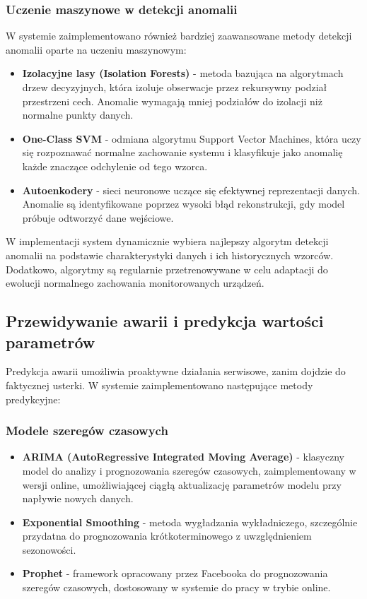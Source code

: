 \subsubsection{Uczenie maszynowe w detekcji anomalii}
\label{subsubsec:ml_anomalie}

W systemie zaimplementowano również bardziej zaawansowane metody detekcji anomalii oparte na uczeniu maszynowym:

\begin{itemize}
    \item \textbf{Izolacyjne lasy (Isolation Forests)} - metoda bazująca na algorytmach drzew decyzyjnych, która izoluje obserwacje przez rekursywny podział przestrzeni cech. Anomalie wymagają mniej podziałów do izolacji niż normalne punkty danych.
    \item \textbf{One-Class SVM} - odmiana algorytmu Support Vector Machines, która uczy się rozpoznawać normalne zachowanie systemu i klasyfikuje jako anomalię każde znaczące odchylenie od tego wzorca.
    \item \textbf{Autoenkodery} - sieci neuronowe uczące się efektywnej reprezentacji danych. Anomalie są identyfikowane poprzez wysoki błąd rekonstrukcji, gdy model próbuje odtworzyć dane wejściowe.
\end{itemize}

W implementacji system dynamicznie wybiera najlepszy algorytm detekcji anomalii na podstawie charakterystyki danych i ich historycznych wzorców. Dodatkowo, algorytmy są regularnie przetrenowywane w celu adaptacji do ewolucji normalnego zachowania monitorowanych urządzeń.

\subsection{Przewidywanie awarii i predykcja wartości parametrów}
\label{subsec:predykcja_awarii}

Predykcja awarii umożliwia proaktywne działania serwisowe, zanim dojdzie do faktycznej usterki. W systemie zaimplementowano następujące metody predykcyjne:

\subsubsection{Modele szeregów czasowych}
\label{subsubsec:szeregi_czasowe}

\begin{itemize}
    \item \textbf{ARIMA (AutoRegressive Integrated Moving Average)} - klasyczny model do analizy i prognozowania szeregów czasowych, zaimplementowany w wersji online, umożliwiającej ciągłą aktualizację parametrów modelu przy napływie nowych danych.
    \item \textbf{Exponential Smoothing} - metoda wygładzania wykładniczego, szczególnie przydatna do prognozowania krótkoterminowego z uwzględnieniem sezonowości.
    \item \textbf{Prophet} - framework opracowany przez Facebooka do prognozowania szeregów czasowych, dostosowany w systemie do pracy w trybie online.
\end{itemize}

